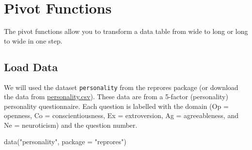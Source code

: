 \documentclass[
  oneside]{book}
\newenvironment{Shaded}{\begin{snugshade}}{\end{snugshade}}
\newcommand{\AttributeTok}[1]{\textcolor[rgb]{0.77,0.63,0.00}{#1}}
\newcommand{\FunctionTok}[1]{\textcolor[rgb]{0.00,0.00,0.00}{#1}}
\newcommand{\NormalTok}[1]{#1}
\newcommand{\StringTok}[1]{\textcolor[rgb]{0.31,0.60,0.02}{#1}}
\begin{document}
\hypertarget{pivot}{%
\section{Pivot Functions}\label{pivot}}

The pivot functions allow you to transform a data table from wide to long or long to wide in one step.

\hypertarget{load-data}{%
\subsection{Load Data}\label{load-data}}

We will used the dataset \texttt{personality} from the reprores package (or download the data from \href{./data/personality.csv}{personality.csv}). These data are from a 5-factor (personality) personality questionnaire. Each question is labelled with the domain (Op = openness, Co = conscientiousness, Ex = extroversion, Ag = agreeableness, and Ne = neuroticism) and the question number.

\begin{Shaded}
\begin{Highlighting}[]
\FunctionTok{data}\NormalTok{(}\StringTok{"personality"}\NormalTok{, }\AttributeTok{package =} \StringTok{"reprores"}\NormalTok{)}
\end{Highlighting}
\end{Shaded}
\end{document}
